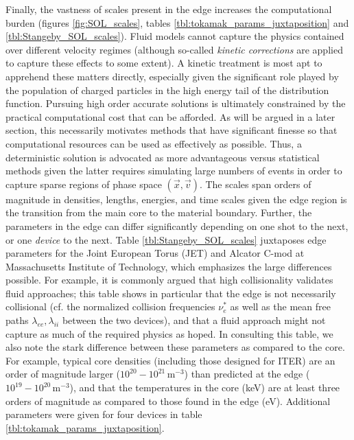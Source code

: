 \documentclass[11pt,titlepage]{report}
\begin{document}
Finally, the vastness of scales present in the edge increases the computational burden (figures \ref{fig:SOL_scales}, tables \ref{tbl:tokamak_params_juxtaposition} and \ref{tbl:Stangeby_SOL_scales}). Fluid models cannot capture the physics contained over different velocity regimes (although so-called \emph{kinetic corrections} are applied to capture these effects to some extent). A kinetic treatment is most apt to apprehend these matters directly, especially given the significant role played by the population of charged particles in the high energy tail of the distribution function. Pursuing high order accurate solutions is ultimately constrained by the practical computational cost that can be afforded. As will be argued in a later section, this necessarily motivates methods that have significant finesse so that computational resources can be used as effectively as possible. Thus, a deterministic solution is advocated as more advantageous versus statistical methods given the latter requires simulating large numbers of events in order to capture sparse regions of phase space $(\vec{x},\vec{v})$. The scales span orders of magnitude in densities, lengths, energies, and time scales given the edge region is the transition from the main core to the material boundary. Further, the parameters in the edge can differ significantly depending on one shot to the next, or one \emph{device} to the next. Table \ref{tbl:Stangeby_SOL_scales} juxtaposes edge parameters for the Joint European Torus (JET) and Alcator C-mod at Massachusetts Institute of Technology, which emphasizes the large differences possible. For example, it is commonly argued that high collisionality validates fluid approaches; this table shows in particular that the edge is not necessarily collisional (cf. the normalized collision frequencies $\nu_e^*$ as well as the mean free paths $\lambda_{ee}, \lambda_{ii}$ between the two devices), and that a fluid approach might not capture as much of the required physics as hoped. In consulting this table, we also note the stark difference between these parameters as compared to the core. For example, typical core densities (including those designed for ITER) are an order of magnitude larger ($10^{20} - 10^{21} \, \mathrm{m^{-3}}$) than predicted at the edge ($10^{19} - 10^{20} \, \mathrm{m^{-3}}$), and that the temperatures in the core (keV) are at least three orders of magnitude as compared to those found in the edge (eV). Additional parameters were given for four devices in table \ref{tbl:tokamak_params_juxtaposition}.
\end{document}
